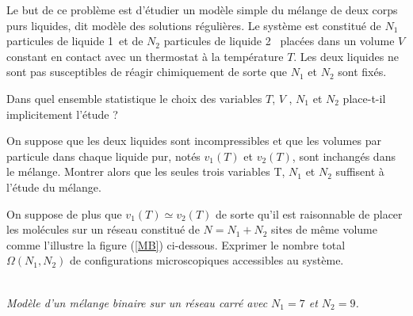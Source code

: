 Le but de ce problème est d'étudier un modèle simple du mélange de deux corps purs
liquides, dit \og modèle des solutions régulières\fg. Le système est constitué de $N_1$ particules de \og liquide 1\fg \ et de $N_2$ particules de \og liquide 2 \fg \ placées dans un volume $V$ constant en contact avec un thermostat à la température $T$. Les deux liquides ne sont pas susceptibles de réagir chimiquement de sorte que $N_1$ et $N_2$ sont fixés.



\question
Dans quel ensemble statistique le choix des variables $T$, $V$ , $N_1$ et $N_2$ place-t-il implicitement l'étude ?

\question
On suppose que les deux liquides sont incompressibles et que les volumes par particule dans chaque liquide pur, notés $v_1(T)$ et $v_2(T)$, sont inchangés dans le mélange. Montrer alors que les seules trois variables T, $N_1$ et $N_2$ suffisent à l'étude du mélange.

\question
On suppose de plus que $v_1(T) \simeq v_2(T)$ de sorte qu'il est raisonnable de placer les molécules sur un réseau constitué de $N=N_1+N_2$ sites de même volume comme l'illustre la figure (\ref{MB}) ci-dessous. Exprimer le nombre total $\Omega(N_1, N_2)$ de configurations microscopiques accessibles au système.

\begin{center} \\
\textit{Modèle d'un mélange binaire sur un réseau carré avec $N_1=7$ et $N_2=9$.}
\label{MB}
\end{center}


